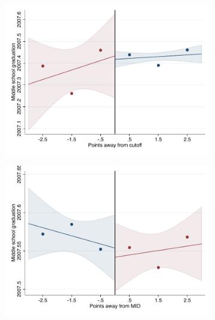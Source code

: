 \documentclass[oneside,11pt]{article}
\begin{document}
\begin{figure}[H]
\begin{center}
    \begin{subfigure}{0.475\textwidth}
        \centering
        \includegraphics[width=\textwidth]{04_Figures/rd_plot_tau_ano_cert_IPN3.pdf}
    \end{subfigure}
    \begin{subfigure}{0.475\textwidth}
        \centering
        \includegraphics[width=\textwidth]{04_Figures/rd_plot_mid_ano_cert_IPN3.pdf}
    \end{subfigure}


\end{center}
\end{figure}
\end{document}
